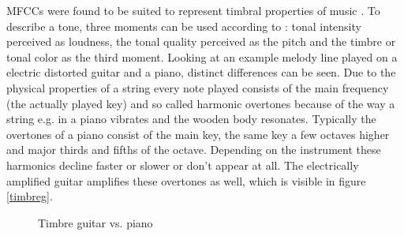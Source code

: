 \FloatBarrier
MFCCs were found to be suited to represent timbral properties of music \cite[p. 55 ff]{knees1}. To describe a tone, three moments can be used according to \cite[pp. 15]{musicdata}: tonal intensity perceived as loudness, the tonal quality perceived as the pitch and the timbre or tonal color as the third moment. Looking at an example melody line played on a electric distorted guitar and a piano, distinct differences can be seen. Due to the physical properties of a string every note played consists of the main frequency (the actually played key) and so called harmonic overtones because of the way a string e.g. in a piano vibrates and the wooden body resonates. Typically the overtones of a piano consist of the main key, the same key a few octaves higher and major thirds and fifths of the octave. Depending on the instrument these harmonics decline faster or slower or don't appear at all. The electrically amplified guitar amplifies these overtones as well, which is visible in figure \ref{timbreg}.
\begin{figure}[htbp]
	\centering
	\caption{Timbre guitar vs. piano}	
	\label{fig:timbre}
\end{figure}
